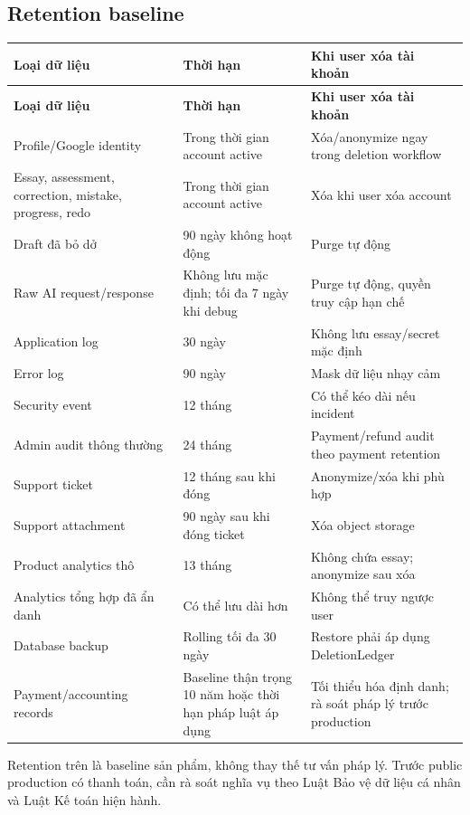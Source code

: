 \documentclass[11pt,a4paper]{article}
\begin{document}
\subsection{Retention baseline}
\small
\setlength{\tabcolsep}{4pt}
\renewcommand{\arraystretch}{1.18}
\begin{longtable}{|P{0.27\textwidth}|P{0.25\textwidth}|P{0.40\textwidth}|}
\hline
\textbf{Loại dữ liệu} & \textbf{Thời hạn} & \textbf{Khi user xóa tài khoản} \\ \hline
\endfirsthead
\hline
\textbf{Loại dữ liệu} & \textbf{Thời hạn} & \textbf{Khi user xóa tài khoản} \\ \hline
\endhead
Profile/\allowbreak{}Google identity & Trong thời gian account active & Xóa/\allowbreak{}anonymize ngay trong deletion workflow \\ \hline
Essay, assessment, correction, mistake, progress, redo & Trong thời gian account active & Xóa khi user xóa account \\ \hline
Draft đã bỏ dở & 90 ngày không hoạt động & Purge tự động \\ \hline
Raw AI request/\allowbreak{}response & Không lưu mặc định; tối đa 7 ngày khi debug & Purge tự động, quyền truy cập hạn chế \\ \hline
Application log & 30 ngày & Không lưu essay/\allowbreak{}secret mặc định \\ \hline
Error log & 90 ngày & Mask dữ liệu nhạy cảm \\ \hline
Security event & 12 tháng & Có thể kéo dài nếu incident \\ \hline
Admin audit thông thường & 24 tháng & Payment/\allowbreak{}refund audit theo payment retention \\ \hline
Support ticket & 12 tháng sau khi đóng & Anonymize/\allowbreak{}xóa khi phù hợp \\ \hline
Support attachment & 90 ngày sau khi đóng ticket & Xóa object storage \\ \hline
Product analytics thô & 13 tháng & Không chứa essay; anonymize sau xóa \\ \hline
Analytics tổng hợp đã ẩn danh & Có thể lưu dài hơn & Không thể truy ngược user \\ \hline
Database backup & Rolling tối đa 30 ngày & Restore phải áp dụng DeletionLedger \\ \hline
Payment/\allowbreak{}accounting records & Baseline thận trọng 10 năm hoặc thời hạn pháp luật áp dụng & Tối thiểu hóa định danh; rà soát pháp lý trước production \\ \hline
\end{longtable}
\normalsize
\begin{importantbox}
Retention trên là baseline sản phẩm, không thay thế tư vấn pháp lý. Trước public production có thanh toán, cần rà soát nghĩa vụ theo Luật Bảo vệ dữ liệu cá nhân và Luật Kế toán hiện hành.
\end{importantbox}
\end{document}
